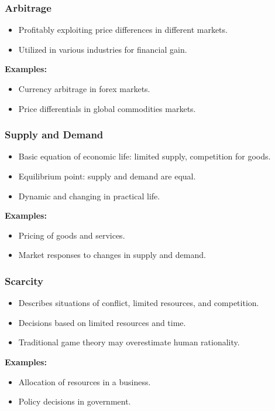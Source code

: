 \begin{frame}[fragile]\frametitle{Arbitrage}
\begin{itemize}
    \item Profitably exploiting price differences in different markets.
    \item Utilized in various industries for financial gain.
\end{itemize}
\textbf{Examples:}
\begin{itemize}
    \item Currency arbitrage in forex markets.
    \item Price differentials in global commodities markets.
\end{itemize}
\end{frame}

\begin{frame}[fragile]\frametitle{Supply and Demand}
\begin{itemize}
    \item Basic equation of economic life: limited supply, competition for goods.
    \item Equilibrium point: supply and demand are equal.
    \item Dynamic and changing in practical life.
\end{itemize}
\textbf{Examples:}
\begin{itemize}
    \item Pricing of goods and services.
    \item Market responses to changes in supply and demand.
\end{itemize}
\end{frame}

\begin{frame}[fragile]\frametitle{Scarcity}
\begin{itemize}
    \item Describes situations of conflict, limited resources, and competition.
    \item Decisions based on limited resources and time.
    \item Traditional game theory may overestimate human rationality.
\end{itemize}
\textbf{Examples:}
\begin{itemize}
    \item Allocation of resources in a business.
    \item Policy decisions in government.
\end{itemize}
\end{frame}

